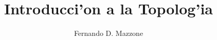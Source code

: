\documentclass[12pt, a4paper]{book}
\theoremstyle{plain}
\theoremstyle{plain} {\theorembodyfont{\normalfont}
\newtheorem{ejercicio}{Ejercicio}[chapter]}
\begin{document}


\newcommand{\nn}{\mathbb{N}}
\newcommand{\rr}{\mathbb{R}}
\newcommand{\C}{\overline}
\newcommand{\mimarginpar}[1]{\marginpar{\framebox{#1}}}
\makeatletter
\renewcommand{\p@enumii}{\theenumi.}

\makeatother


\newenvironment{demo}{\noindent\emph{Dem.}}{\nolinebreak\hfill{1}$\square$
\newline\vspace{2\baselineskip}}






\title{Introducci'on a la Topolog'ia}
\author{Fernando D. Mazzone}

\date{}
\maketitle


\tableofcontents

\listoffigures









\printindex
\end{document}
